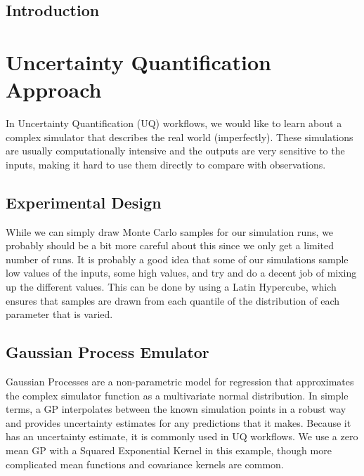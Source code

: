 \documentclass[openacc]{rstransa}%
\begin{document}

\begin{fmtext}
\section{Introduction}




\end{fmtext}


\maketitle

\section{Uncertainty Quantification Approach}

In Uncertainty Quantification (UQ) workflows, we would like to learn about a complex simulator that describes the real world (imperfectly). These simulations are usually computationally intensive and the outputs are very sensitive to the inputs, making it hard to use them directly to compare with observations.

\subsection{Experimental Design}

While we can simply draw Monte Carlo samples for our simulation runs, we probably should be a bit more careful about this since we only get a limited number of runs. It is probably a good idea that some of our simulations sample low values of the inputs, some high values, and try and do a decent job of mixing up the different values. This can be done by using a Latin Hypercube, which ensures that samples are drawn from each quantile of the distribution of each parameter that is varied.

\subsection{Gaussian Process Emulator}

Gaussian Processes are a non-parametric model for regression that approximates the complex simulator function as a multivariate normal distribution. In simple terms, a GP interpolates between the known simulation points in a robust way and provides uncertainty estimates for any predictions that it makes. Because it has an uncertainty estimate, it is commonly used in UQ workflows. We use a zero mean GP with a Squared Exponential Kernel in this
example, though more complicated mean functions and covariance kernels are common.
\end{document}
